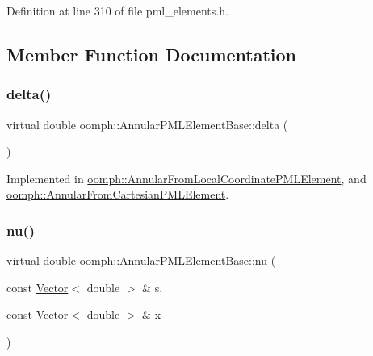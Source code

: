 Definition at line 310 of file pml\+\_\+elements.\+h.



\subsection{Member Function Documentation}
\mbox{\label{classoomph_1_1AnnularPMLElementBase_ad76f02aa6eb19a5757e7d4cc26ec45fa}} 
\subsubsection{\texorpdfstring{delta()}{delta()}}
{\footnotesize\ttfamily virtual double oomph\+::\+Annular\+P\+M\+L\+Element\+Base\+::delta (\begin{DoxyParamCaption}{ }\end{DoxyParamCaption})\hspace{0.3cm}{\ttfamily [pure virtual]}}



Implemented in \hyperlink{classoomph_1_1AnnularFromLocalCoordinatePMLElement_affe7de11a2275aac57b0ea2c0594ce7d}{oomph\+::\+Annular\+From\+Local\+Coordinate\+P\+M\+L\+Element}, and \hyperlink{classoomph_1_1AnnularFromCartesianPMLElement_a9cf84a8abb2f74bf71b6dbf4cc3958f1}{oomph\+::\+Annular\+From\+Cartesian\+P\+M\+L\+Element}.

\mbox{\label{classoomph_1_1AnnularPMLElementBase_ac6671111f31c3a5012d0df53a1c24b76}} 
\subsubsection{\texorpdfstring{nu()}{nu()}}
{\footnotesize\ttfamily virtual double oomph\+::\+Annular\+P\+M\+L\+Element\+Base\+::nu (\begin{DoxyParamCaption}\item[{const \hyperlink{classoomph_1_1Vector}{Vector}$<$ double $>$ \&}]{s,  }\item[{const \hyperlink{classoomph_1_1Vector}{Vector}$<$ double $>$ \&}]{x }\end{DoxyParamCaption})\hspace{0.3cm}{\ttfamily [pure virtual]}}



